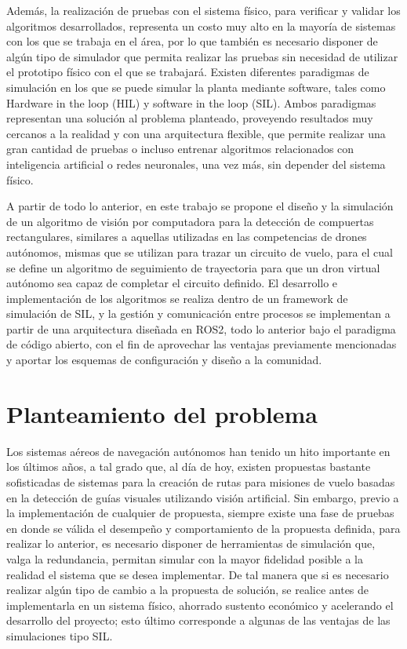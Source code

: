 Además, la realización de pruebas con el sistema físico, para verificar y validar los algoritmos desarrollados, representa un costo muy alto en la mayoría de sistemas con los que se trabaja en el área, por lo que también es necesario disponer de algún tipo de simulador que permita realizar las pruebas sin necesidad de utilizar el prototipo físico con el que se trabajará. Existen diferentes paradigmas de simulación en los que se puede simular la planta mediante software, tales como Hardware in the loop (HIL) y software in the loop (SIL). Ambos paradigmas representan una solución al problema planteado, proveyendo resultados muy cercanos a la realidad y con una arquitectura flexible, que permite realizar una gran cantidad de pruebas o incluso entrenar algoritmos relacionados con inteligencia artificial o redes neuronales, una vez más, sin depender del sistema físico. 

A partir de todo lo anterior, en este trabajo se propone el diseño y la simulación de un algoritmo de visión por computadora para la detección de compuertas rectangulares, similares a aquellas utilizadas en las competencias de drones autónomos, mismas que se utilizan para trazar un circuito de vuelo, para el cual se define un algoritmo de seguimiento de trayectoria para que un dron virtual autónomo sea capaz de completar el circuito definido.  El desarrollo e implementación de los algoritmos se realiza dentro de un framework de simulación de SIL, y la gestión y comunicación entre procesos se implementan a partir de una arquitectura diseñada en ROS2, todo lo anterior bajo el paradigma de código abierto, con el fin de aprovechar las ventajas previamente mencionadas y aportar los esquemas de configuración y diseño a la comunidad.


\section{Planteamiento del problema}
Los sistemas aéreos de navegación autónomos han tenido un hito importante en los últimos años, a tal grado que, al día de hoy, existen propuestas bastante sofisticadas de sistemas para la creación de rutas para misiones de vuelo basadas en la detección de guías visuales utilizando visión artificial. Sin embargo, previo a la implementación de cualquier de propuesta, siempre existe una fase de pruebas en donde se válida el desempeño y comportamiento de la propuesta definida, para realizar lo anterior, es necesario disponer de herramientas de simulación que, valga la redundancia, permitan simular con la mayor fidelidad posible a la realidad el sistema que se desea implementar. De tal manera que si es necesario realizar algún tipo de cambio a la propuesta de solución, se realice antes de implementarla en un sistema físico, ahorrado sustento económico y acelerando el desarrollo del proyecto; esto último corresponde a algunas de las ventajas de las simulaciones tipo SIL. 

